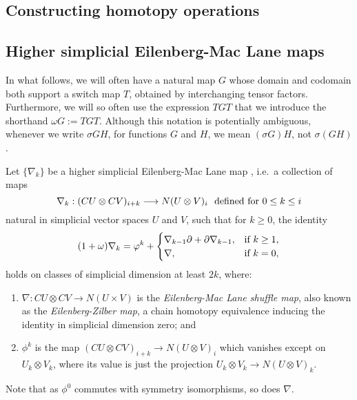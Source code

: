 \documentclass[11pt]{amsart} \renewcommand{\baselinestretch}{1.2}
\theoremstyle{plain}
\numberwithin{equation}{section} %
\theoremstyle{plain}
\numberwithin{equation}{chapter} %
\let\oldphi\phi
\let\phi\varphi
\renewcommand{\to}{\longrightarrow}
\newcommand{\citeBOX}[2][]{\cite[\mbox{#1}]{#2}}
\newcommand{\twist}{\omega}
\newcommand{\Nabla}{\nabla}
\newcommand{\SectionOrChapter}[1]{\section{\textbf{#1}}}
\newcommand{\SubsectionOrSection}[1]{\subsection{#1}}
\begin{document}
\begin{Constructing homotopy operations}



\SectionOrChapter{Constructing homotopy operations}
\label{sec:Constructing homotopy operations}
\label{Constructing homotopy operations}
\SubsectionOrSection{Higher simplicial Eilenberg-Mac Lane maps}%


In what follows, we will often have a natural map $G$ whose domain and codomain both support a switch map $T$, obtained by interchanging tensor factors. Furthermore, we will so often  use  the expression $TGT$ that we introduce the shorthand $\twist G:=TGT$. %
Although this notation is potentially ambiguous, whenever we write $\sigma GH$, for functions $G$ and $H$, we mean $(\sigma G)H$, not $\sigma(GH)$.

Let $\{\Nabla_k\}$ be a higher simplicial Eilenberg-Mac Lane map \citeBOX[\S3]{DwyerHtpyOpsSimpComAlg.pdf}, i.e.\ a collection of maps
\[\Nabla_k:(CU\otimes CV)_{i+k}\to N(U\otimes V)_i\textup{\ \ defined for $0\leq k\leq i$}\]
natural in simplicial vector spaces $U$ and $V$, such that for $k\geq0$, the identity
\[(1+\twist) \Nabla_k=\oldphi^k+\begin{cases}
\Nabla_{k-1}\partial+\partial\Nabla_{k-1},&\textup{if }k\geq1,\\
\Nabla,&\textup{if }k=0,
\end{cases}
\]
holds on classes of simplicial dimension at least $2k$, where:
\begin{enumerate}
\setlength{\parindent}{.25in}
\item $\Nabla:CU\otimes CV\to N(U\times V)$ is the \emph{Eilenberg-Mac Lane shuffle map}, also known as the \emph{Eilenberg-Zilber map}, a chain homotopy equivalence inducing the identity in simplicial dimension zero; and
\item $\oldphi^k$ is the map $(CU\otimes CV)_{i+k}\to N(U\otimes V)_i$ which vanishes except on $U_k\otimes V_k$, where its value is just the projection $U_k\otimes V_k\to N(U\otimes V)_k$.
\end{enumerate}
Note that as $\oldphi^0$ commutes with symmetry isomorphisms, so does $\Nabla$.






\end{Constructing homotopy operations}
\end{document}
